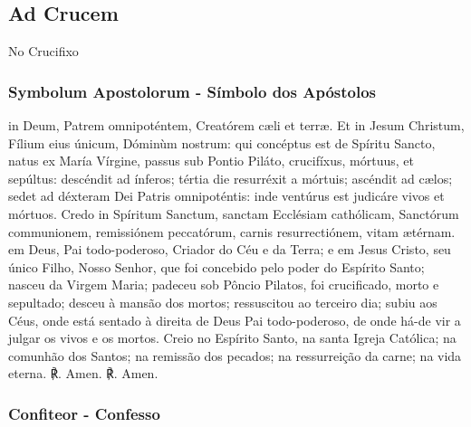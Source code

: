 \emph{}

\subsection{Ad Crucem}
\begin{nscenter}No Crucifixo\end{nscenter}
\subsubsection{Symbolum Apostolorum - Símbolo dos Apóstolos}
\begin{paracol}{2}
 in Deum, Patrem omnipoténtem, Creatórem cæli et terræ. Et in Jesum Christum, Fílium eius únicum, Dóminùm nostrum: qui concéptus est de Spíritu Sancto, natus ex María Vírgine, passus sub Pontio Piláto, crucifíxus, mórtuus, et sepúltus: descéndit ad ínferos; tértia die resurréxit a mórtuis; ascéndit ad cælos; sedet ad déxteram Dei Patris omnipoténtis: inde ventúrus est judicáre vivos et mórtuos. Credo in Spíritum Sanctum, sanctam Ecclésiam cathólicam, Sanctórum communionem, remissiónem peccatórum, carnis resurrectiónem, vitam ætérnam.
\switchcolumn
{} em Deus, Pai todo-poderoso, Criador do Céu e da Terra; e em Jesus Cristo, seu único Filho, Nosso Senhor, que foi concebido pelo poder do Espírito Santo; nasceu da Virgem Maria; padeceu sob Pôncio Pilatos, foi crucificado, morto e sepultado; desceu à mansão dos mortos; ressuscitou ao terceiro dia; subiu aos Céus, onde está sentado à direita de Deus Pai todo-poderoso, de onde há-de vir a julgar os vivos e os mortos. Creio no Espírito Santo, na santa Igreja Católica; na comunhão dos Santos; na remissão dos pecados; na ressurreição da carne; na vida eterna.
\switchcolumn*
℟. Amen.
\switchcolumn
℟. Amen.
\end{paracol}

\pagebreak [3]

\subsubsection{Confiteor - Confesso}

\emph{}

